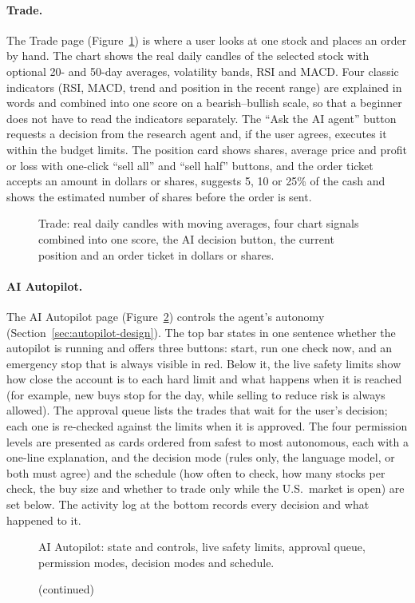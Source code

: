 \paragraph{Trade.} The Trade page (Figure~\ref{fig:ui-terminal}) is where a user looks at one stock and places an order by hand. The chart shows the real daily candles of the selected stock with optional 20- and 50-day averages, volatility bands, RSI and MACD. Four classic indicators (RSI, MACD, trend and position in the recent range) are explained in words and combined into one score on a bearish--bullish scale, so that a beginner does not have to read the indicators separately. The ``Ask the AI agent'' button requests a decision from the research agent and, if the user agrees, executes it within the budget limits. The position card shows shares, average price and profit or loss with one-click ``sell all'' and ``sell half'' buttons, and the order ticket accepts an amount in dollars or shares, suggests 5, 10 or 25\% of the cash and shows the estimated number of shares before the order is sent.
\begin{figure}[!htbp]
\centering
{}
\caption{Trade: real daily candles with moving averages, four chart signals combined into one score, the AI decision button, the current position and an order ticket in dollars or shares.}
\label{fig:ui-terminal}
\end{figure}

\paragraph{AI Autopilot.} The AI Autopilot page (Figure~\ref{fig:ui-autopilot}) controls the agent's autonomy (Section~\ref{sec:autopilot-design}). The top bar states in one sentence whether the autopilot is running and offers three buttons: start, run one check now, and an emergency stop that is always visible in red. Below it, the live safety limits show how close the account is to each hard limit and what happens when it is reached (for example, new buys stop for the day, while selling to reduce risk is always allowed). The approval queue lists the trades that wait for the user's decision; each one is re-checked against the limits when it is approved. The four permission levels are presented as cards ordered from safest to most autonomous, each with a one-line explanation, and the decision mode (rules only, the language model, or both must agree) and the schedule (how often to check, how many stocks per check, the buy size and whether to trade only while the U.S.\ market is open) are set below. The activity log at the bottom records every decision and what happened to it.
\begin{figure}[!htbp]
\centering
{}
\caption{AI Autopilot: state and controls, live safety limits, approval queue, permission modes, decision modes and schedule.}
\label{fig:ui-autopilot}
\end{figure}
\begin{figure}[!htbp]
\ContinuedFloat
\centering
{}
\caption[]{(continued)}
\end{figure}

